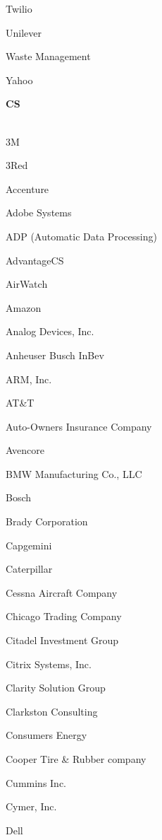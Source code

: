 \documentclass[twoside]{article}
\begin{document}
\begin{center}
\begin{multicols}{5}
\begin{FlushLeft}
\begin{compactitem}
\item Twilio
\item Unilever
\item Waste Management
\item Yahoo
\end{compactitem}
        \end{FlushLeft}
        \vspace{1em}
        {\fontsize{14}{16}\selectfont \bf CS}\\
        \vspace{-1em}
        ~\hrulefill~
        \vspace{-.9em}
        \begin{FlushLeft}
        \begin{compactitem}
        \item 3M
\item 3Red
\item Accenture
\item Adobe Systems
\item ADP (Automatic Data Processing)
\item AdvantageCS
\item AirWatch
\item Amazon
\item Analog Devices, Inc.
\item Anheuser Busch InBev
\item ARM, Inc.
\item AT\&T
\item Auto-Owners Insurance Company
\item Avencore
\item BMW Manufacturing Co., LLC
\item Bosch
\item Brady Corporation
\item Capgemini
\item Caterpillar
\item Cessna Aircraft Company
\item Chicago Trading Company
\item Citadel Investment Group
\item Citrix Systems, Inc.
\item Clarity Solution Group
\item Clarkston Consulting
\item Consumers Energy
\item Cooper Tire \& Rubber company
\item Cummins Inc.
\item Cymer, Inc.
\item Dell

\end{compactitem}
\end{FlushLeft}
\end{multicols}
\end{center}
\end{document}
